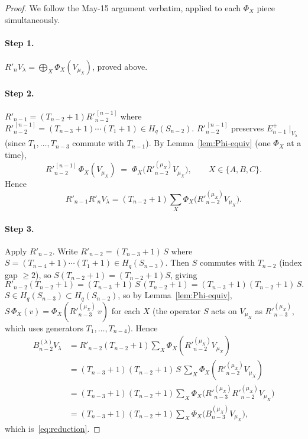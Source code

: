\documentclass[11pt]{article}
\theoremstyle{definition}
\begin{document}
\begin{proof}
We follow the May-15 argument verbatim, applied to each
$\Phi_X$ piece simultaneously.

\paragraph{Step 1.}  $R'_n V_\lambda=\bigoplus_X\Phi_X(V_{\mu_X})$,
proved above.

\paragraph{Step 2.}  $R'_{n-1}=(T_{n-2}{+}1)R'_{n-2}^{\,[n-1]}$
where $R'_{n-2}^{\,[n-1]}=(T_{n-3}{+}1)\cdots(T_1{+}1)\in H_q(S_{n-2})$.
$R'_{n-2}^{\,[n-1]}$ preserves $E_{n-1}^+\!\mid_{V_\lambda}$
(since $T_1,\ldots,T_{n-3}$ commute with $T_{n-1}$).  By
Lemma~\ref{lem:Phi-equiv} (one $\Phi_X$ at a time),
\[
   R'_{n-2}^{\,[n-1]}\,\Phi_X(V_{\mu_X})
   \;=\;\Phi_X\big(R'_{n-2}^{(\mu_X)}V_{\mu_X}\big),
   \qquad X\in\{A,B,C\}.
\]
Hence
\[
   R'_{n-1}R'_n V_\lambda
   = (T_{n-2}{+}1)\sum_X\Phi_X\big(R'_{n-2}^{(\mu_X)} V_{\mu_X}\big).
\]

\paragraph{Step 3.}  Apply $R'_{n-2}$.  Write
$R'_{n-2}=(T_{n-3}{+}1)\,S$ where $S=(T_{n-4}{+}1)\cdots(T_1{+}1)\in
H_q(S_{n-3})$.  Then $S$ commutes with $T_{n-2}$ (index gap $\ge 2$),
so $S(T_{n-2}{+}1)=(T_{n-2}{+}1)S$, giving
\[
   R'_{n-2}(T_{n-2}{+}1)
   = (T_{n-3}{+}1)\,S\,(T_{n-2}{+}1)
   = (T_{n-3}{+}1)(T_{n-2}{+}1)\,S.
\]
$S\in H_q(S_{n-3})\subset H_q(S_{n-2})$, so by
Lemma~\ref{lem:Phi-equiv},
$S\,\Phi_X(v)=\Phi_X(R'_{n-3}^{(\mu_X)}\,v)$ for each $X$ (the
operator $S$ acts on $V_{\mu_X}$ as $R'_{n-3}^{(\mu_X)}$, which uses
generators $T_1,\ldots,T_{n-4}$).  Hence
\begin{align*}
   B_{n-2}^{(\lambda)} V_\lambda
   &= R'_{n-2}(T_{n-2}{+}1)\sum_X\Phi_X(R'_{n-2}^{(\mu_X)}V_{\mu_X})\\
   &= (T_{n-3}{+}1)(T_{n-2}{+}1)\,S\,\sum_X\Phi_X(R'_{n-2}^{(\mu_X)}V_{\mu_X})\\
   &= (T_{n-3}{+}1)(T_{n-2}{+}1)\sum_X
      \Phi_X\big(R'_{n-3}^{(\mu_X)}R'_{n-2}^{(\mu_X)}V_{\mu_X}\big)\\
   &= (T_{n-3}{+}1)(T_{n-2}{+}1)\sum_X\Phi_X\big(B_{n-3}^{(\mu_X)} V_{\mu_X}\big),
\end{align*}
which is~\eqref{eq:reduction}.
\end{proof}
\end{document}
